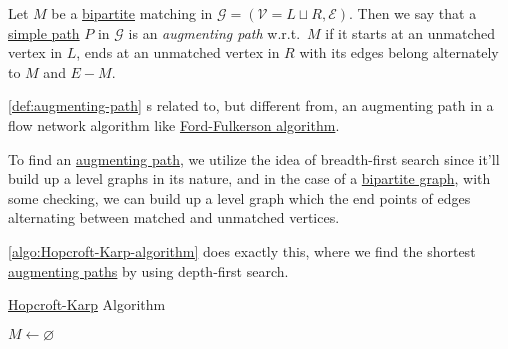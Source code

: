 \begin{definition}\label{def:augmenting-path}
	Let \(M\) be a \href{https://en.wikipedia.org/wiki/Bipartite_graph}{bipartite} matching in \(\mathcal{G} = (\mathcal{V} = L \sqcup R, \mathcal{E})\). Then we say that a \hyperref[def:simple-path]{simple path} \(P\) in \(\mathcal{G} \) is an \emph{augmenting path} w.r.t.\ \(M\) if it starts at an unmatched vertex in \(L\), ends at an unmatched vertex in \(R\) with its edges belong alternately to \(M\) and \(E - M\).
\end{definition}

\begin{note}
	\autoref{def:augmenting-path} s related to, but different from, an augmenting path in a flow network algorithm like \href{https://en.wikipedia.org/wiki/Ford%E2%80%93Fulkerson_algorithm}{Ford-Fulkerson algorithm}.
\end{note}

\begin{intuition}
	To find an \hyperref[def:augmenting-path]{augmenting path}, we utilize the idea of breadth-first search since it'll build up a level graphs in its nature, and in the case of a \href{https://en.wikipedia.org/wiki/Bipartite_graph}{bipartite graph}, with some checking, we can build up a level graph which the end points of edges alternating between matched and unmatched vertices.
\end{intuition}

\autoref{algo:Hopcroft-Karp-algorithm} does exactly this, where we find the shortest \hyperref[def:augmenting-path]{augmenting paths} by using depth-first search.

\begin{algorithm}[H]\label{algo:Hopcroft-Karp-algorithm}
	\DontPrintSemicolon{}
	\caption{\href{https://en.wikipedia.org/wiki/Hopcroft-Karp_algorithm}{Hopcroft-Karp} Algorithm}
	\BlankLine

	\(M\gets \varnothing \)
\end{algorithm}

